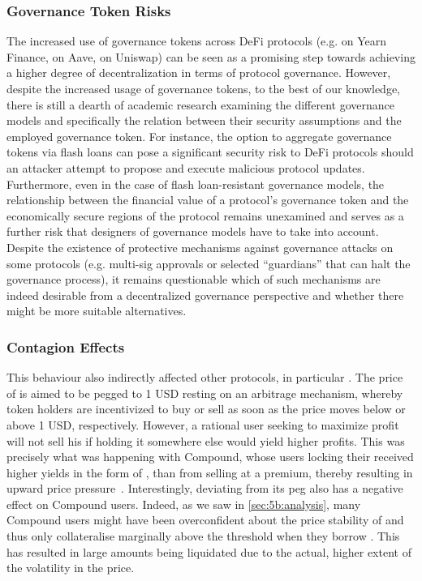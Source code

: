 \subsubsection{Governance Token Risks}
The increased use of governance tokens across DeFi protocols (e.g.  on Yearn Finance,  on Aave,  on Uniswap) can be seen as a promising step towards achieving a higher degree of decentralization in terms of protocol governance.
However, despite the increased usage of governance tokens, to the best of our knowledge, there is still a dearth of academic research examining the different governance models and specifically the relation between their security assumptions and the employed governance token.
For instance, the option to aggregate governance tokens via flash loans \cite{wang2020} can pose a significant security risk to DeFi protocols should an attacker attempt to propose and execute malicious protocol updates.
Furthermore, even in the case of flash loan-resistant governance models, the relationship between the financial value of a protocol's governance token and the economically secure regions of the protocol remains unexamined and serves as a further risk that designers of governance models have to take into account.
Despite the existence of protective mechanisms against governance attacks on some protocols (e.g. multi-sig approvals or selected ``guardians'' that can halt the governance process), it remains questionable which of such mechanisms are indeed desirable from a decentralized governance perspective and whether there might be more suitable alternatives.

\subsubsection{Contagion Effects}
This behaviour also indirectly affected other protocols, in particular .
The price of  is aimed to be pegged to 1 USD resting on an arbitrage mechanism, whereby token holders are incentivized to buy or sell  as soon as the price moves below or above 1 USD, respectively.
However, a rational user seeking to maximize profit will not sell his  if holding it somewhere else would yield higher profits.
This was precisely what was happening with Compound, whose users locking their  received higher yields in the form of , than from selling  at a premium, thereby resulting in upward price pressure~\cite{cyrus2020upcoming}.
Interestingly,  deviating from its peg also has a negative effect on Compound users.
Indeed, as we saw in \autoref{sec:5b:analysis}, many Compound users might have been overconfident about the price stability of  and thus only collateralise marginally above the threshold when they borrow .
This has resulted in large amounts being liquidated due to the actual, higher extent of the volatility in the  price.

